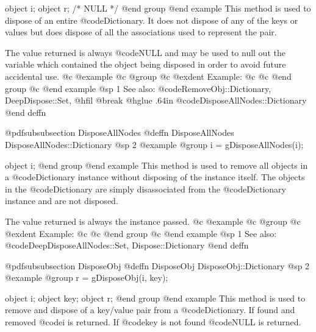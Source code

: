 object  i;
object  r;     /*  NULL  */
@end group
@end example
This method is used to dispose of an entire @code{Dictionary}.  It does not
dispose of any of the keys or values but does dispose of all the
associations used to represent the pair.  

The value returned is always @code{NULL} and may be used to null out
the variable which contained the object being disposed in order to
avoid future accidental use.
@c @example
@c @group
@c @exdent Example:
@c 
@c @end group
@c @end example
@sp 1
See also:  @code{RemoveObj::Dictionary, DeepDispose::Set,}
@hfil @break @hglue .64in      @code{DisposeAllNodes::Dictionary}
@end deffn
















@pdfsubsubsection {DisposeAllNodes}
@deffn {DisposeAllNodes} DisposeAllNodes::Dictionary
@sp 2
@example
@group
i = gDisposeAllNodes(i);

object  i;
@end group
@end example
This method is used to remove all objects in a @code{Dictionary}
instance without disposing of the instance itself.  The objects in the
@code{Dictionary} are simply disassociated from the @code{Dictionary}
instance and are not disposed.

The value returned is always the instance passed.
@c @example
@c @group
@c @exdent Example:
@c 
@c @end group
@c @end example
@sp 1
See also:  @code{DeepDisposeAllNodes::Set, Dispose::Dictionary}
@end deffn






















@pdfsubsubsection {DisposeObj}
@deffn {DisposeObj} DisposeObj::Dictionary
@sp 2
@example
@group
r = gDisposeObj(i, key);

object  i;
object  key;
object  r;
@end group
@end example
This method is used to remove and dispose of a key/value pair from a
@code{Dictionary}.  If found and removed @code{i} is returned.  If @code{key}
is not found @code{NULL} is returned.

